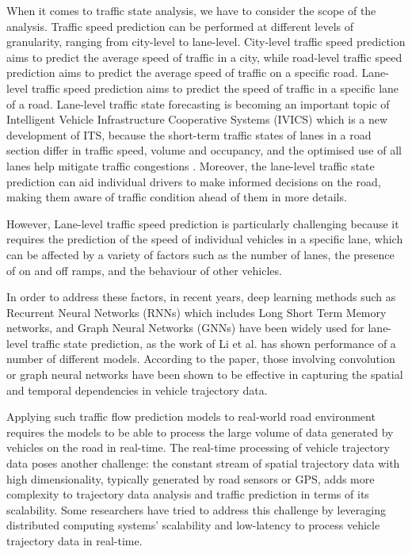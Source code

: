 \documentclass[11pt]{uonthesis}
\begin{document}
When it comes to traffic state analysis, we have to consider the scope of the analysis. Traffic speed prediction can be performed at different levels of granularity, ranging from city-level to lane-level. City-level traffic speed prediction aims to predict the average speed of traffic in a city, while road-level traffic speed prediction aims to predict the average speed of traffic on a specific road. Lane-level traffic speed prediction aims to predict the speed of traffic in a specific lane of a road. Lane-level traffic state forecasting is becoming an important topic of Intelligent Vehicle Infrastructure Cooperative Systems (IVICS) which is a new development of ITS, because the short-term traffic states of lanes in a road section differ in traffic speed, volume and occupancy, and the optimised use of all lanes help mitigate traffic congestions \cite{GU20191}. Moreover, the lane-level traffic state prediction can aid individual drivers to make informed decisions on the road, making them aware of traffic condition ahead of them in more details.

However, Lane-level traffic speed prediction is particularly challenging because it requires the prediction of the speed of individual vehicles in a specific lane, which can be affected by a variety of factors such as the number of lanes, the presence of on and off ramps, and the behaviour of other vehicles.

In order to address these factors, in recent years, deep learning methods such as Recurrent Neural Networks (RNNs) which includes Long Short Term Memory networks, and Graph Neural Networks (GNNs) have been widely used for lane-level traffic state prediction, as the work of Li et al. \cite{li2024unifyinglaneleveltrafficprediction} has shown performance of a number of different models. According to the paper, those involving 
convolution or graph neural networks have been shown to be effective in capturing the spatial and temporal dependencies in vehicle trajectory data.

Applying such traffic flow prediction models to real-world road environment requires the models to be able to process the large volume of data generated by vehicles on the road in real-time. The real-time processing of vehicle trajectory data poses another challenge: the constant stream of spatial trajectory data with high dimensionality, typically generated by road sensors or GPS, adds more complexity to trajectory data analysis and traffic prediction in terms of its scalability. Some researchers have tried to address this challenge by leveraging distributed computing systems' scalability and low-latency to process vehicle trajectory data in real-time.
\end{document}
